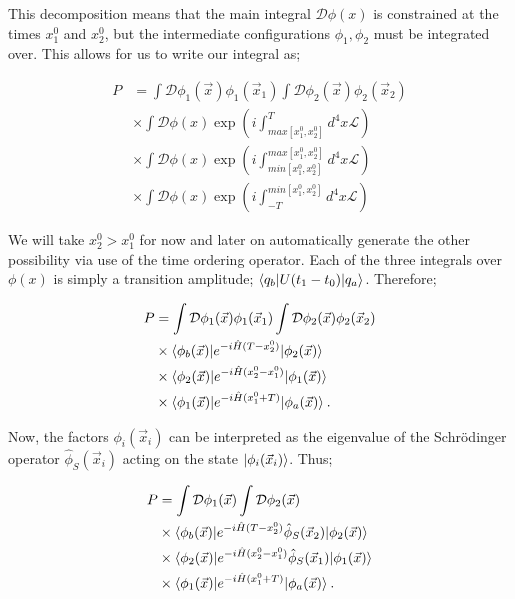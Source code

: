 This decomposition means that the main integral $\mathcal{D} \phi(x)$ is constrained at the times $x_1^0$ and $x_2^0$, but the intermediate configurations $\phi_1, \phi_2$ must be integrated over. This allows for us to write our integral as;

\begin{equation}
\begin{split}
P &= \int \mathcal{D} \phi_1(\vec{x}) \phi_1(\vec{x}_1) \int \mathcal{D} \phi_2(\vec{x}) \phi_2(\vec{x}_2) \\
&\times  \int \mathcal{D} \phi(x) \exp \left(i \int_{max[x_1^0, x_2^0]}^T d^4 x \mathscr{L}\right) \\
& \times \int \mathcal{D} \phi(x) \exp \left(i \int_{min [x_1^0, x_2^0]}^{max[x_1^0, x_2^0]} d^4 x \mathscr{L}\right) \\
& \times \int \mathcal{D} \phi(x) \exp \left(i \int_{-T}^{min [x_1^0, x_2^0]} d^4 x \mathscr{L}\right)
\end{split}
\end{equation}

We will take $x_2^0 > x_1^0$ for now and later on automatically generate the other possibility via use of the time ordering operator. Each of the three integrals over $\phi(x)$ is simply a transition amplitude; $\mathinner{\langle q_b\vert U(t_1 - t_0)\vert q_a\rangle}_{}$. Therefore;

\begin{equation}
\begin{split}
P &= \int \mathcal{D} \phi_1(\vec{x}) \phi_1(\vec{x}_1) \int \mathcal{D} \phi_2(\vec{x}) \phi_2(\vec{x}_2) \\
& \times \mathinner{\langle\phi_b(\vec{x})\vert e^{-i \hat{H} (T - x_2^0)}\vert\phi_2(\vec{x})\rangle}_{} \\
& \times \mathinner{\langle\phi_2(\vec{x})\vert e^{-i \hat{H} (x_2^0 - x_1^0)}\vert\phi_1(\vec{x})\rangle}_{} \\
&\times \mathinner{\langle\phi_1(\vec{x})\vert e^{-i \hat{H} (x_1^0+T)}\vert\phi_a(\vec{x})\rangle}_{}. 
\end{split}
\end{equation}

Now, the factors $\phi_i (\vec{x}_i)$ can be interpreted as the eigenvalue of the Schr\"odinger operator $\hat{\phi}_S (\vec{x}_i)$ acting on the state $\mathinner{\lvert\phi_i(\vec{x}_i)\rangle}_{\hspace{-0.1em}}$. Thus;

\begin{equation}
\begin{split}
P &= \int \mathcal{D} \phi_1(\vec{x}) \int \mathcal{D} \phi_2(\vec{x})  \\
& \times \mathinner{\langle\phi_b(\vec{x})\vert e^{-i \hat{H} (T - x_2^0)} \hat{\phi}_S (\vec{x}_2)\vert\phi_2(\vec{x})\rangle}_{} \\
& \times \mathinner{\langle\phi_2(\vec{x})\vert e^{-i \hat{H} (x_2^0 - x_1^0)} \hat{\phi}_S (\vec{x}_1)\vert\phi_1(\vec{x})\rangle}_{} \\
&\times \mathinner{\langle\phi_1(\vec{x})\vert e^{-i \hat{H} (x_1^0+T)}\vert\phi_a(\vec{x})\rangle}_{}.
\end{split}
\end{equation}

